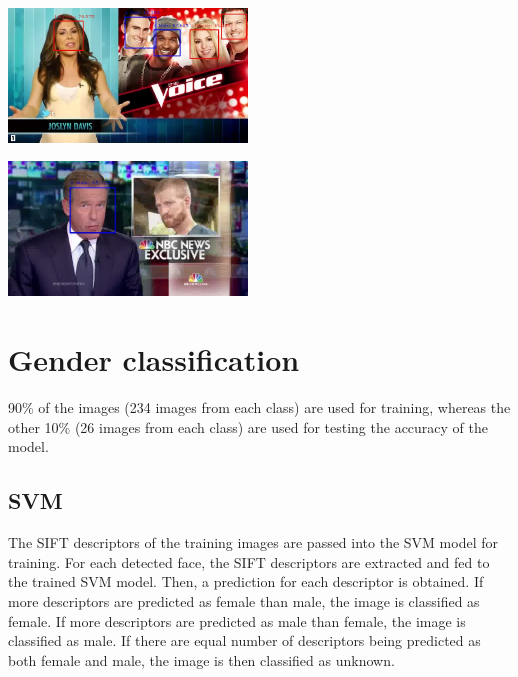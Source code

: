 \documentclass{article}
\begin{document}
\vspace*{10pt}
\begin{minipage}{0.5\linewidth}
 \label{fig: face_good}
\centering
\includegraphics[width=2.5in]{../output/clip_2/069.jpg}
\end{minipage}
\begin{minipage}{0.5\linewidth}
 \label{fig: face_bad}
\centering
\includegraphics[width=2.5in]{../output/clip_1_face/110.jpg}
\end{minipage}
\vspace*{10pt}

\section{Gender classification}
90\% of the images (234 images from each class) are used for training, whereas the other 10\% (26 images from each class) are used for testing the accuracy of the model.

\subsection*{SVM}
The SIFT descriptors of the training images are passed into the SVM model for training.
For each detected face, the SIFT descriptors are extracted and fed to the trained SVM model. Then, a prediction for each descriptor is obtained. If more descriptors are predicted as female than male, the image is classified as female. If more descriptors are predicted as male than female, the image is classified as male. If there are equal number of descriptors being predicted as both female and male, the image is then classified as unknown.
\end{document}
